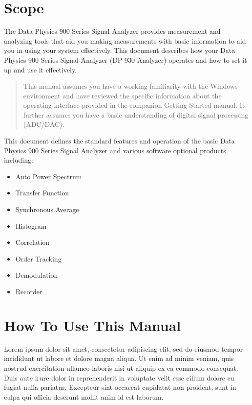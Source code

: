 \documentclass[,openany,oneside,a4paper]{memoir}
\begin{document}
\hypertarget{scope}{%
\section{Scope}\label{scope}}

The Data Physics 900 Series Signal Analyzer provides measurement and
analyzing tools that aid you making measurements with basic information
to aid you in using your system effectively. This document describes how
your Data Physics 900 Series Signal Analyzer (DP 930 Analyzer) operates
and how to set it up and use it effectively.

\begin{quote}
This manual assumes you have a working familiarity with the Windows
environment and have reviewed the specific information about the
operating interface provided in the companion Getting Started manual. It
further assumes you have a basic understanding of digital signal
processing (ADC/DAC).
\end{quote}

This document defines the standard features and operation of the basic
Data Physics 900 Series Signal Analyzer and various software optional
products including:

\begin{itemize}
\tightlist
\item
  Auto Power Spectrum
\item
  Transfer Function
\item
  Synchronous Average
\item
  Histogram
\item
  Correlation
\item
  Order Tracking
\item
  Demodulation
\item
  Recorder
\end{itemize}

\hypertarget{howto}{%
\section{How To Use This Manual}\label{howto}}

Lorem ipsum dolor sit amet, consectetur adipiscing elit, sed do eiusmod tempor incididunt ut labore et dolore magna aliqua. Ut enim ad minim veniam, quis nostrud exercitation ullamco laboris nisi ut aliquip ex ea commodo consequat. Duis aute irure dolor in reprehenderit in voluptate velit esse cillum dolore eu fugiat nulla pariatur. Excepteur sint occaecat cupidatat non proident, sunt in culpa qui officia deserunt mollit anim id est laborum.
\end{document}
